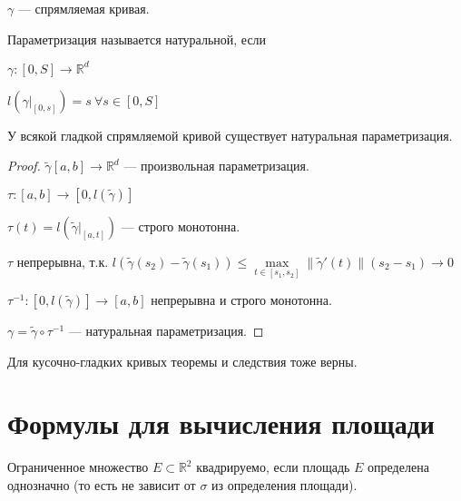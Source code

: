     \begin{Def}

        $\gamma$ --- спрямляемая кривая.

        Параметризация называется натуральной, если 
    
        $\gamma \colon [0, S] \rightarrow \mathbb{R}^d$

        $l(\gamma|_{[0, s]}) = s \: \forall s \in [0, S]$

    \end{Def}

    \begin{theorem}

        У всякой гладкой спрямляемой кривой существует натуральная параметризация.

    \end{theorem}

    \begin{proof}

        $\widetilde{\gamma}[a, b] \rightarrow \mathbb{R}^d$ --- произвольная параметризация.

        $\tau \colon [a, b] \rightarrow [0, l(\widetilde{\gamma})]$

        $\tau(t) = l(\widetilde{\gamma}|_{[a, t]})$ --- строго монотонна.

        $\tau$ непрерывна, т.к. $l(\widetilde{\gamma}(s_2) - \widetilde{\gamma}(s_1)) \le \max\limits_{t \in [s_1,s_2]}\|\widetilde{\gamma}'(t)\|(s_2 - s_1) \rightarrow 0$

        $\tau^{-1} \colon [0, l(\widetilde{\gamma})] \rightarrow [a, b]$ непрерывна и строго монотонна.

        $\gamma = \widetilde{\gamma} \circ \tau^{-1}$ --- натуральная параметризация.

    \end{proof}

    \begin{Rem}

        Для кусочно-гладких кривых теоремы и следствия тоже верны.

    \end{Rem}

\section {Формулы для вычисления площади}

    \begin{Def}

        Ограниченное множество $E \subset \mathbb{R}^2$ квадрируемо, если площадь $E$ определена однозначно (то есть не зависит от $\sigma$ из определения площади).

    \end{Def}

